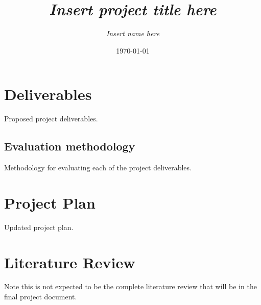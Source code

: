 \documentclass{article} %
\title{\emph{Insert project title here}}  %
\author{\emph{Insert name here}} %
\date{\today}
\begin{document}
\maketitle

\section{Deliverables}

{\color{red} Proposed project deliverables.}


\subsection{Evaluation methodology}

{\color{red} Methodology for evaluating each of the project deliverables.}


\section{Project Plan}

{\color{red} Updated project plan.}


\section{Literature Review}

{\color{red} Note this is not expected to be the complete literature review that will be in the final project document.} 




 
  
\end{document}
